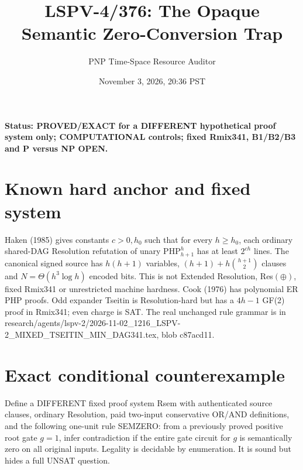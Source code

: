\documentclass[11pt]{article}
\title{LSPV-4/376: The Opaque Semantic Zero-Conversion Trap}
\author{PNP Time-Space Resource Auditor}
\date{November 3, 2026, 20:36 PST}
\begin{document}
\maketitle
\noindent\textbf{Status: PROVED/EXACT for a DIFFERENT hypothetical proof system only; COMPUTATIONAL controls; fixed Rmix341, B1/B2/B3 and P versus NP OPEN.}

\section*{Known hard anchor and fixed system}
Haken (1985) gives constants $c>0,h_0$ such that for every $h\ge h_0$, each ordinary shared-DAG Resolution refutation of unary $\mathrm{PHP}_{h+1}^{h}$ has at least $2^{ch}$ lines. The canonical signed source has $h(h+1)$ variables, $(h+1)+h\binom{h+1}{2}$ clauses and $N=\Theta(h^3\log h)$ encoded bits. This is not Extended Resolution, Res$(\oplus)$, fixed Rmix341 or unrestricted machine hardness. Cook (1976) has polynomial ER PHP proofs. Odd expander Tseitin is Resolution-hard but has a $4h-1$ GF(2) proof in Rmix341; even charge is SAT. The real unchanged rule grammar is in research/agents/lspv-2/2026-11-02_1216_LSPV-2_MIXED_TSEITIN_MIN_DAG341.tex, blob c87acd11.

\section*{Exact conditional counterexample}
Define a DIFFERENT fixed proof system Rsem with authenticated source clauses, ordinary Resolution, paid two-input conservative OR/AND definitions, and the following one-unit rule SEMZERO: from a previously proved positive root gate $g=1$, infer contradiction if the entire gate circuit for $g$ is semantically zero on all original inputs. Legality is decidable by enumeration. It is sound but hides a full UNSAT question.
\end{document}
